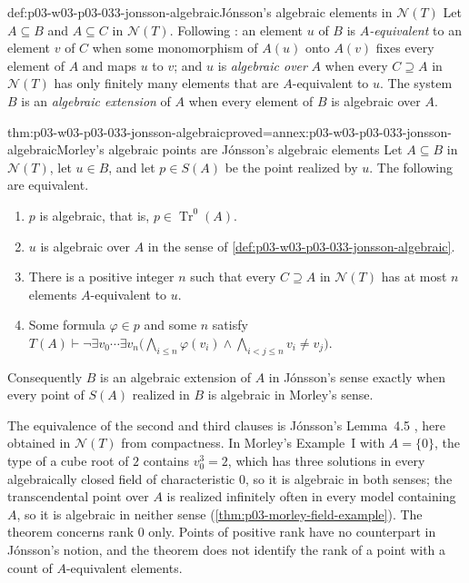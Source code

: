 \begin{hbdefinition}{def:p03-w03-p03-033-jonsson-algebraic}{Jónsson's algebraic elements in \(\mathcal N(T)\)}
Let \(A\subseteq B\) and \(A\subseteq C\) in \(\mathcal N(T)\). Following
\cite[p.~185, Definitions~4.3 and 4.4]{Jonsson1962}: an element \(u\) of
\(B\) is \emph{\(A\)-equivalent} to an element \(v\) of \(C\) when some
monomorphism of \(A(u)\) onto \(A(v)\) fixes every element of \(A\) and
maps \(u\) to \(v\); and \(u\) is \emph{algebraic over} \(A\) when every
\(C\supseteq A\) in \(\mathcal N(T)\) has only finitely many elements that
are \(A\)-equivalent to \(u\). The system \(B\) is an \emph{algebraic
extension} of \(A\) when every element of \(B\) is algebraic over \(A\).
\end{hbdefinition}

\begin{hbtheorem}{thm:p03-w03-p03-033-jonsson-algebraic}{proved=annex:p03-w03-p03-033-jonsson-algebraic}{Morley's algebraic points are Jónsson's algebraic elements}
Let \(A\subseteq B\) in \(\mathcal N(T)\), let \(u\in B\), and let
\(p\in S(A)\) be the point realized by \(u\). The following are
equivalent.
\begin{enumerate}
\item \(p\) is algebraic, that is, \(p\in\operatorname{Tr}^0(A)\).
\item \(u\) is algebraic over \(A\) in the sense of
\cref{def:p03-w03-p03-033-jonsson-algebraic}.
\item There is a positive integer \(n\) such that every
\(C\supseteq A\) in \(\mathcal N(T)\) has at most \(n\) elements
\(A\)-equivalent to \(u\).
\item Some formula \(\varphi\in p\) and some \(n\) satisfy
\(T(A)\vdash\neg\exists v_0\cdots\exists v_n
\bigl(\bigwedge_{i\leq n}\varphi(v_i)\wedge\bigwedge_{i<j\leq n}v_i\neq v_j\bigr)\).
\end{enumerate}
Consequently \(B\) is an algebraic extension of \(A\) in Jónsson's sense
exactly when every point of \(S(A)\) realized in \(B\) is algebraic in
Morley's sense.
\end{hbtheorem}

The equivalence of the second and third clauses is Jónsson's Lemma~4.5
\cite[p.~185]{Jonsson1962}, here obtained in \(\mathcal N(T)\) from
compactness. In Morley's Example~I with \(A=\{0\}\), the type of a cube
root of \(2\) contains \(v_0^3=2\), which has three solutions in every
algebraically closed field of characteristic \(0\), so it is algebraic in
both senses; the transcendental point over \(A\) is realized infinitely
often in every model containing \(A\), so it is algebraic in neither sense
(\cref{thm:p03-morley-field-example}). The theorem concerns rank \(0\)
only. Points of positive rank have no counterpart in Jónsson's notion, and
the theorem does not identify the rank of a point with a count of
\(A\)-equivalent elements.


